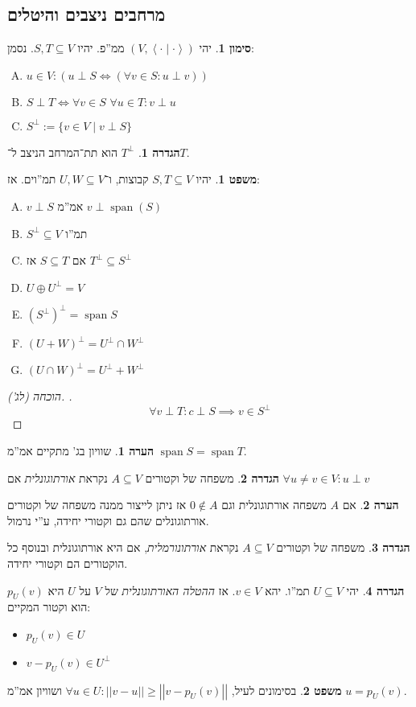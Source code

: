 \documentclass[a4paper]{article}
\newcommand\ra    {\rangle}
\newcommand\la    {\langle}
\DeclareMathOperator{\Sp}      {span}
\newcommand\co        {\colon}
\newcommand\norm[1]   {\left \vert \left \vert #1 \right \vert \right \vert}
\newcommand\smut      {\left \la \cdot \mid \cdot \right \ra}
\newcommand\cl [1]    {\left ( #1 \right )}
\theoremstyle{definition}
\newtheorem{Theorem}{\color{myblue}משפט}
\newtheorem{Definition}{\color{mygreen}הגדרה}
\newtheorem{Remark}{\color{mycyan}הערה}
\newtheorem{Notion}{\color{myred}סימון}
\newcommand\theo  [1] {\begin{Theorem}#1\end{Theorem}}
\newcommand\defi  [1] {\begin{Definition}#1\end{Definition}}
\newcommand\rmark [1] {\begin{Remark}#1\end{Remark}}
\newcommand\noti  [1] {\begin{Notion}#1\end{Notion}}
\begin{document}
	\subsection{מרחבים ניצבים והיטלים}
	\noti{יהי $(V, \smut)$ ממ''פ. יהיו $S, T \subseteq V$. נסמן: 
		\begin{enumerate}[A.]
			\item \hfil $u \in V \co \cl{u \perp S \iff (\forall v \in S\co u \perp v)}$
			\item \hfil $S \perp T \iff \forall v \in S \,\, \forall u \in T \co v \perp u$ 
			\item \hfil $S^{\perp} := \{v \in V \mid v \perp S\}$
	\end{enumerate}}
	\defi{$T^{\perp}$ הוא תת־המרחב הניצב ל־$T$. }
	\theo{יהיו $S, T \subseteq V$ קבוצות, ו־$U, W \subseteq V$ תמ''וים. אז: 
		\begin{enumerate}[A.]
			\item $v \perp S$ אמ''מ $v \perp \Sp(S)$
			\item $S^{\perp} \subseteq V$ תמ''ו
			\item אם $S \subseteq T$ אז $T^\perp \subseteq S^\perp$
			\item \hfil $U \oplus U^{\perp} = V$
			\item \hfil $\cl{S^\perp}^\perp = \Sp S$
			\item \hfil $(U + W)^{\perp} = U^{\perp} \cap W^{\perp}$
			\item \hfil $(U \cap W)^{\perp} = U^{\perp} + W^{\perp}$
	\end{enumerate}}
	\begin{proof}[הוכחה (לג'). ]
		\[ \forall v \perp T \co c \perp S \implies v \in S^{\perp} \]
	\end{proof}
	\rmark{שוויון בג' מתקיים אמ''מ $\Sp S = \Sp T$. }
	
	\defi{משפחה של וקטורים $A \subseteq V$ נקראת \textit{אורתוגונלית} אם $\forall u \neq v \in V\co u \perp v$}
	\rmark{אם $A$ משפחה אורתוגונלית וגם $0 \notin A$ אז ניתן לייצור ממנה משפחה של וקטורים אורתוגונלים שהם גם וקטורי יחידה, ע''י נרמול. }
	\defi{משפחה של וקטורים $A \subseteq V$ נקראת \textit{אורתונורמלית}, אם היא אורתוגונלית ובנוסף כל הוקטורים הם וקטורי יחידה. }
	
	\defi{יהי $U \subseteq V$ תמ''ו. יהא $v \in V$. אז \textit{ההטלה האורתוגונלית} של $V$ על $U$ היא $p_U(v)$ הוא וקטור המקיים: 
		\begin{itemize}
			\item \hfil $p_U(v) \in U$ 
			\item \hfil $v - p_U(v) \in U^\perp$
	\end{itemize}}
	\theo{בסימונים לעיל, $\forall u \in U \co \norm{v - u} \ge \norm{v - p_U(v)}$ ושוויון אמ''מ $u = p_U(v)$. }
	
\end{document}
